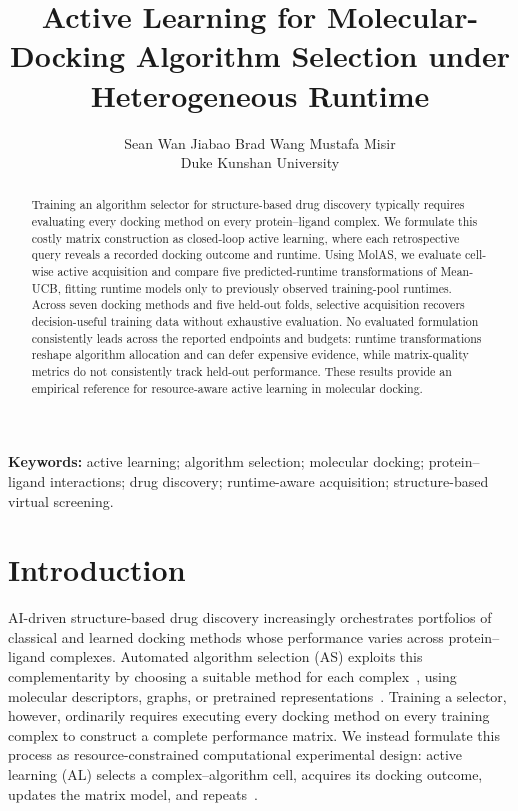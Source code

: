 \documentclass{article}
\title{Active Learning for Molecular-Docking Algorithm Selection under Heterogeneous Runtime}
\author{Sean Wan \qquad Jiabao Brad Wang \qquad Mustafa Misir\\
Duke Kunshan University}
\begin{document}
\maketitle

\begin{abstract}
Training an algorithm selector for structure-based drug discovery typically requires evaluating every docking method on every protein--ligand complex.
We formulate this costly matrix construction as closed-loop active learning, where each retrospective query reveals a recorded docking outcome and runtime.
Using MolAS, we evaluate cell-wise active acquisition and compare five predicted-runtime transformations of Mean-UCB, fitting runtime models only to previously observed training-pool runtimes.
Across seven docking methods and five held-out folds, selective acquisition recovers decision-useful training data without exhaustive evaluation.
No evaluated formulation consistently leads across the reported endpoints and budgets: runtime transformations reshape algorithm allocation and can defer expensive evidence, while matrix-quality metrics do not consistently track held-out performance.
These results provide an empirical reference for resource-aware active learning in molecular docking.
\end{abstract}

\noindent\textbf{Keywords:} active learning; algorithm selection; molecular docking; protein--ligand interactions; drug discovery; runtime-aware acquisition; structure-based virtual screening.

\section{Introduction}
AI-driven structure-based drug discovery increasingly orchestrates portfolios of classical and learned docking methods whose performance varies across protein--ligand complexes. Automated algorithm selection (AS) exploits this complementarity by choosing a suitable method for each complex~\citep{rice1976algorithm,kerschke2019automated}, using molecular descriptors, graphs, or pretrained representations~\citep{chen2023algorithm,cao2025mc,wang2026molecular}. Training a selector, however, ordinarily requires executing every docking method on every training complex to construct a complete performance matrix. We instead formulate this process as resource-constrained computational experimental design: active learning (AL) selects a complex--algorithm cell, acquires its docking outcome, updates the matrix model, and repeats~\citep{cohn1996active,tharwat2023survey,huseljic2026refine}.
\end{document}
